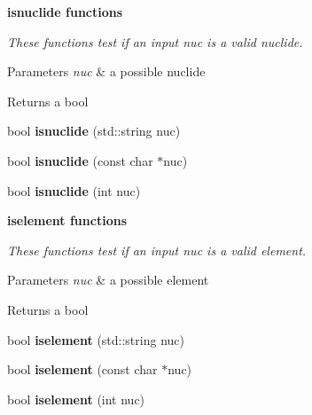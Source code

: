 \begin{Indent}\textbf{ isnuclide functions}\par
{\em These functions test if an input {\itshape nuc} is a valid nuclide. 
\begin{DoxyParams}{Parameters}
{\em nuc} & a possible nuclide \\
\hline
\end{DoxyParams}
\begin{DoxyReturn}{Returns}
a bool 
\end{DoxyReturn}
}\begin{DoxyCompactItemize}
\item 
\mbox{\label{namespacepyne_1_1nucname_a98523777b3d9e835b929bb9e49986312}} 
bool {\bfseries isnuclide} (std\+::string nuc)
\item 
\mbox{\label{namespacepyne_1_1nucname_af462f395c08b88dadcf4b2f0d0e6a090}} 
bool {\bfseries isnuclide} (const char $\ast$nuc)
\item 
\mbox{\label{namespacepyne_1_1nucname_a78423ab514ba698a3e86d808423f364b}} 
bool {\bfseries isnuclide} (int nuc)
\end{DoxyCompactItemize}
\end{Indent}
\begin{Indent}\textbf{ iselement functions}\par
{\em These functions test if an input {\itshape nuc} is a valid element. 
\begin{DoxyParams}{Parameters}
{\em nuc} & a possible element \\
\hline
\end{DoxyParams}
\begin{DoxyReturn}{Returns}
a bool 
\end{DoxyReturn}
}\begin{DoxyCompactItemize}
\item 
\mbox{\label{namespacepyne_1_1nucname_a9e11edcac3e156039532a2806436dc27}} 
bool {\bfseries iselement} (std\+::string nuc)
\item 
\mbox{\label{namespacepyne_1_1nucname_a64f8ead8b5d31a7119039511f3a164c7}} 
bool {\bfseries iselement} (const char $\ast$nuc)
\item 
\mbox{\label{namespacepyne_1_1nucname_a2905de5d4024d9f5d287026d2e8e74f3}} 
bool {\bfseries iselement} (int nuc)
\end{DoxyCompactItemize}
\end{Indent}
